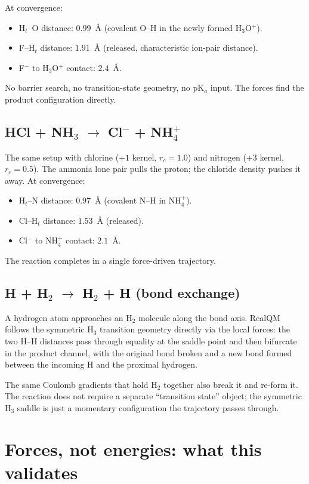 At convergence:
\begin{itemize}
\item H$_t$--O distance: $0.99$~\AA{} (covalent O--H in the newly formed H$_3$O$^+$).
\item F--H$_t$ distance: $1.91$~\AA{} (released, characteristic ion-pair distance).
\item F$^-$ to H$_3$O$^+$ contact: $2.4$~\AA.
\end{itemize}
No barrier search, no transition-state geometry, no pK$_a$ input. The forces find the product configuration directly.

\subsection{HCl + NH$_3$ $\to$ Cl$^-$ + NH$_4^+$}

The same setup with chlorine ($+1$ kernel, $r_c = 1.0$) and nitrogen ($+3$ kernel, $r_c = 0.5$). The ammonia lone pair pulls the proton; the chloride density pushes it away. At convergence:
\begin{itemize}
\item H$_t$--N distance: $0.97$~\AA{} (covalent N--H in NH$_4^+$).
\item Cl--H$_t$ distance: $1.53$~\AA{} (released).
\item Cl$^-$ to NH$_4^+$ contact: $2.1$~\AA.
\end{itemize}
The reaction completes in a single force-driven trajectory.

\subsection{H + H$_2$ $\to$ H$_2$ + H (bond exchange)}

A hydrogen atom approaches an H$_2$ molecule along the bond axis. RealQM follows the symmetric H$_3$ transition geometry directly via the local forces: the two H--H distances pass through equality at the saddle point and then bifurcate in the product channel, with the original bond broken and a new bond formed between the incoming H and the proximal hydrogen.

The same Coulomb gradients that hold H$_2$ together also break it and re-form it. The reaction does not require a separate ``transition state'' object; the symmetric H$_3$ saddle is just a momentary configuration the trajectory passes through.

\section{Forces, not energies: what this validates}\label{sec:forces-not-energies}

